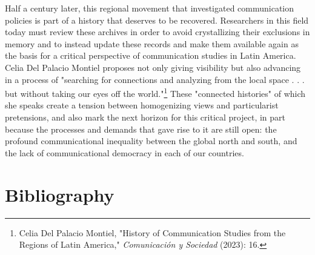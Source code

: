 \documentclass{tufte-handout}
\begin{document}
Half a century later, this regional movement that investigated
communication policies is part of a history that deserves to be
recovered. Researchers in this field today must review these archives in
order to avoid crystallizing their exclusions in memory and to instead
update these records and make them available again as the basis for a
critical perspective of communication studies in Latin America. Celia
Del Palacio Montiel proposes not only giving visibility but also
advancing in a process of "searching for connections and analyzing from
the local space . . . but without taking our eyes off the
world."\footnote{Celia Del Palacio Montiel, "History of Communication
  Studies from the Regions of Latin America," \emph{Comunicación y
  Sociedad} (2023): 16.} These "connected histories" of which she speaks
create a tension between homogenizing views and particularist
pretensions, and also mark the next horizon for this critical project,
in part because the processes and demands that gave rise to it are still
open: the profound communicational inequality between the global north
and south, and the lack of communicational democracy in each of our
countries.




\section{Bibliography}\label{bibliography}
\end{document}

